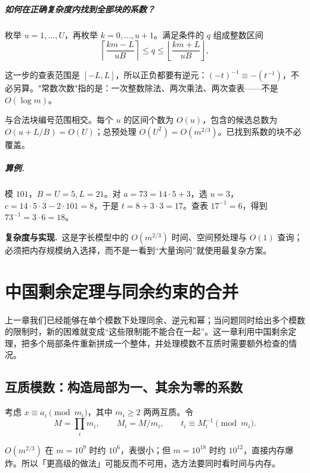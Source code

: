 \documentclass[UTF8,a4paper,11pt,twoside,openright,fontset=fandol]{ctexbook}
\theoremstyle{definition}
\newcommand{\floor}[1]{\left\lfloor #1\right\rfloor}
\newcommand{\ceil}[1]{\left\lceil #1\right\rceil}
\newcommand{\cost}{\par\noindent\textbf{复杂度与实现.}\ }
\begin{document}
\paragraph{如何在正确复杂度内找到全部块的系数？}
枚举 $u=1,\ldots,U$，再枚举 $k=0,\ldots,u+1$。满足条件的 $q$ 组成整数区间
\[
 \ceil{\frac{km-L}{uB}}\le q\le\floor{\frac{km+L}{uB}},
\]

\begin{tip}
这一步的查表范围是 $[-L,L]$，所以正负都要有逆元：$(-t)^{-1}\equiv-(t^{-1})$，不必另算。"常数次数"指的是：一次整数除法、两次乘法、两次查表——不是 $O(\log m)$。
\end{tip}

与合法块编号范围相交。每个 $u$ 的区间个数为 $O(u)$，包含的候选总数为 $O(u+L/B)=O(U)$；总预处理 $O(U^2)=O(m^{2/3})$。已找到系数的块不必覆盖。

\paragraph{算例.} 模 $101$，$B=U=5,L=21$。对 $a=73=14\cdot5+3$，选 $u=3$，$c=14\cdot5\cdot3-2\cdot101=8$，于是 $t=8+3\cdot3=17$。查表 $17^{-1}=6$，得到 $73^{-1}=3\cdot6=18$。
\cost 这是字长模型中的 $O(m^{2/3})$ 时间、空间预处理与 $O(1)$ 查询；必须把内存规模纳入选择，而不是一看到“大量询问”就使用最复杂方案。



\chapter{中国剩余定理与同余约束的合并}
\begin{chapterintro}[章节导读]
上一章我们已经能够在单个模数下处理同余、逆元和幂；当问题同时给出多个模数的限制时，新的困难就变成“这些限制能不能合在一起”。这一章利用中国剩余定理，把多个局部条件重新拼成一个整体，并处理模数不互质时需要额外检查的情况。
\end{chapterintro}

\section{互质模数：构造局部为一、其余为零的系数}
考虑 $x\equiv a_i\pmod{m_i}$，其中 $m_i\ge2$ 两两互质。令
\[
 M=\prod_i m_i,\qquad M_i=M/m_i,\qquad t_i\equiv M_i^{-1}\pmod{m_i}.
\]

\begin{tip}
$O(m^{2/3})$ 在 $m=10^9$ 时约 $10^6$，表很小；但 $m=10^{18}$ 时约 $10^{12}$，直接内存爆炸。所以「更高级的做法」可能反而不可用，选方法要同时看时间与内存。
\end{tip}
\end{document}
